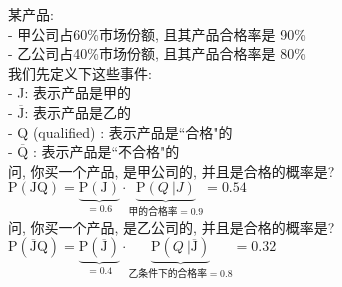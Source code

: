 \documentclass[UTF8]{ctexart}
\begin{document}
\begin{myEnvSample}
	某产品:  \\
	- 甲公司占60\%市场份额, 且其产品合格率是 90\% \\
	- 乙公司占40\%市场份额, 且其产品合格率是 80\% \\
	
	我们先定义下这些事件: \\
	- J: 表示产品是甲的 \\
	- $\overline{\text{J}}$: 表示产品是乙的 \\
	- Q (qualified) : 表示产品是``合格"的 \\
	- $\overline{\text{Q}}$ : 表示产品是``不合格"的 \\
	
    问, 你买一个产品, 是甲公司的, 并且是合格的概率是? \\
    $
    \text{P}\left( \text{JQ} \right) =\underset{=0.6}{\underbrace{\text{P}\left( \text{J} \right) }}\cdot \underset{\text{甲的合格率}=0.9}{\underbrace{\text{P}\left( Q \ | J \right) }}=0.54
    $ \\
    
    问, 你买一个产品, 是乙公司的, 并且是合格的概率是? \\
    $
    \text{P}\left( \overline{\text{J}}\text{Q} \right) =\underset{=0.4}{\underbrace{\text{P}\left( \overline{\text{J}} \right) }}\cdot \underset{\text{乙条件下的合格率}=0.8}{\underbrace{\text{P}\left(Q \ | \overline{\text{J}} \right) }}=0.32
    $      
\end{myEnvSample}
\end{document}
